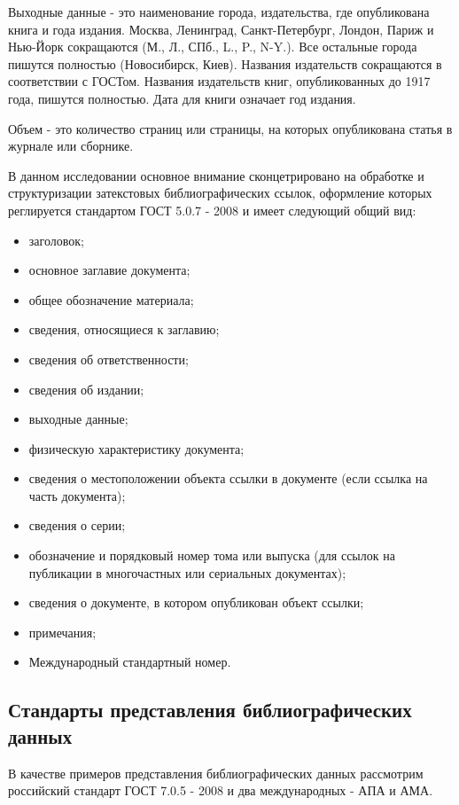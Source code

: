 Выходные данные - это наименование города, издательства, где опубликована книга и года издания. Москва, Ленинград, Санкт-Петербург, Лондон, Париж и Нью-Йорк сокращаются (М., Л., СПб., L., P., N-Y.). Все остальные города пишутся полностью (Новосибирск, Киев). Названия издательств сокращаются в соответствии с ГОСТом. Названия издательств книг, опубликованных до 1917 года, пишутся полностью. Дата для книги означает год издания.

Объем - это количество страниц или страницы, на которых опубликована статья в журнале или сборнике.

В данном исследовании основное внимание сконцетрировано на обработке и структуризации затекстовых библиографических ссылок, оформление которых реглируется стандартом ГОСТ 5.0.7 - 2008 и имеет следующий общий вид:
\begin{itemize}
	\item заголовок;
	\item основное заглавие документа;
	\item общее обозначение материала;
	\item сведения, относящиеся к заглавию;
	\item сведения об ответственности;
	\item сведения об издании;
	\item выходные данные;
	\item физическую характеристику документа;
	\item сведения о местоположении объекта ссылки в документе (если ссылка на часть документа);
	\item сведения о серии;
	\item обозначение и порядковый номер тома или выпуска (для ссылок на публикации в многочастных или сериальных документах);
	\item сведения о документе, в котором опубликован объект ссылки;
	\item примечания;
	\item Международный стандартный номер.
\end{itemize}

\subsection{Стандарты представления библиографических данных}

В качестве примеров представления библиографических данных рассмотрим российский стандарт ГОСТ 7.0.5 - 2008 и два международных - АПА и АМА.

